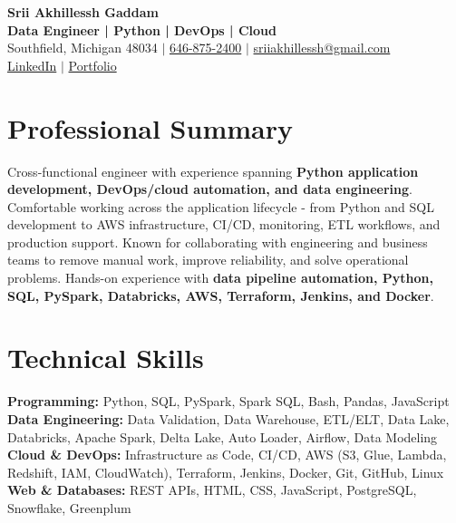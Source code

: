\documentclass[letterpaper,10pt]{article}
\begin{document}
\fontsize{9.35pt}{10.45pt}\selectfont

\begin{center}
    {\LARGE \textbf{Srii Akhillessh Gaddam}} \\[-1pt]
    \textbf{Data Engineer | Python | DevOps | Cloud} \\[2pt]
    Southfield, Michigan 48034 $|$
    \href{tel:6468752400}{646-875-2400} $|$
    \href{mailto:sriiakhillessh@gmail.com}{sriiakhillessh@gmail.com} \\[1pt]
    \href{https://www.linkedin.com/in/srii-akhiilessh-gaddam-b48668191/}{LinkedIn} $|$
    \href{https://sriiakhillesshg.github.io/portfolio/}{Portfolio}
\end{center}
\vspace{-8pt}

\section{Professional Summary}
\small{Cross-functional engineer with experience spanning \textbf{Python application development, DevOps/cloud automation, and data engineering}. Comfortable working across the application lifecycle - from Python and SQL development to AWS infrastructure, CI/CD, monitoring, ETL workflows, and production support. Known for collaborating with engineering and business teams to remove manual work, improve reliability, and solve operational problems. Hands-on experience with \textbf{data pipeline automation, Python, SQL, PySpark, Databricks, AWS, Terraform, Jenkins, and Docker}.}

\section{Technical Skills}
\small{
\textbf{Programming:} Python, SQL, PySpark, Spark SQL, Bash, Pandas, JavaScript \\
\textbf{Data Engineering:} Data Validation, Data Warehouse, ETL/ELT, Data Lake, Databricks, Apache Spark, Delta Lake, Auto Loader, Airflow, Data Modeling \\
\textbf{Cloud \& DevOps:} Infrastructure as Code, CI/CD, AWS (S3, Glue, Lambda, Redshift, IAM, CloudWatch), Terraform, Jenkins, Docker, Git, GitHub, Linux \\
\textbf{Web \& Databases:} REST APIs, HTML, CSS, JavaScript, PostgreSQL, Snowflake, Greenplum
}
\end{document}
